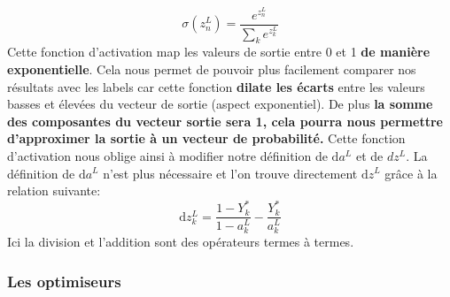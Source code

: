 \documentclass[12pt,a4paper]{extarticle}
\newcommand{\ud}{\mathrm{d}}
\begin{document}
\begin{itemize}
\[\sigma(z^L_n)=\frac{e^{z^L_n}}{\sum_k e^{z^L_k}}\] 
Cette fonction d'activation map les valeurs de sortie entre 0 et 1 \textbf{de manière exponentielle}. Cela nous permet de pouvoir plus facilement comparer nos résultats avec les labels car cette fonction \textbf{dilate les écarts} entre les valeurs basses et élevées du vecteur de sortie (aspect exponentiel). De plus \textbf{la somme des composantes du vecteur sortie sera 1, cela pourra nous permettre d'approximer la sortie à un vecteur de probabilité.} Cette fonction d'activation nous oblige ainsi à modifier notre définition de $\ud a^L$ et de $dz^L$. La définition de $ \ud a^L$ n'est plus nécessaire et l'on trouve directement $\ud z^L$ grâce à la relation suivante: 
\[\ud z^L_k=\frac{1-Y^*_k}{1-a^L_k}-\frac{Y^*_k}{a^L_k}\]
Ici la division et l'addition sont des opérateurs termes à termes.
\end{itemize}



\subsubsection{Les optimiseurs}
\end{document}
